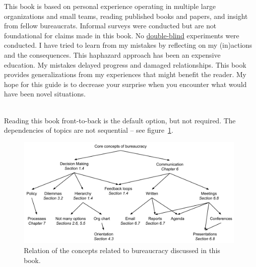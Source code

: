 This book is based on personal experience operating in multiple large organizations and small teams, reading published books and papers, and insight from fellow bureaucrats. Informal surveys were conducted but are not foundational for claims made in this book. \iftoggle{WPinmargin}{\marginpar{[Wikipedia] blinded-\\experiment}}{}
No \href{https://en.wikipedia.org/wiki/Blinded_experiment}{double-blind} 
experiments were conducted. 
I have tried to learn from my mistakes by reflecting on my (in)actions and the consequences. This haphazard approach has been an expensive education. My mistakes delayed progress and damaged relationships. This book  provides generalizations from my experiences that might benefit the reader. My hope for this guide is to decrease your surprise when you encounter what would have been novel situations.

\ \\

Reading this book front-to-back is the default option, but not required. The dependencies of topics are not sequential -- see figure~\ref{fig:core-concepts}.

\begin{figure}[ht]
    \centering
    \includegraphics[width=1\textwidth]{images/core_concepts_map.pdf}
    \caption{Relation of the concepts related to bureaucracy discussed in this book.}
    \label{fig:core-concepts}
\end{figure}


